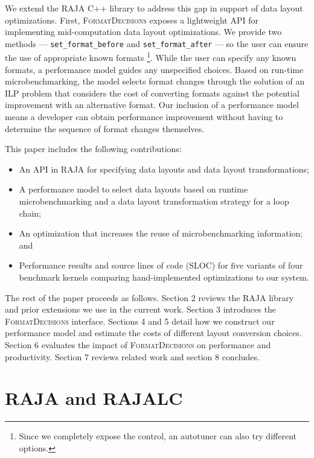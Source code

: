\documentclass[sigconf,review=true]{acmart}
\newcommand{\FormatDecisions}[0]{{\textsc{FormatDecisions}}}
\begin{document}
We extend the RAJA C++ library to address this gap in support of data layout optimizations.
First, \FormatDecisions{} exposes a lightweight API for implementing mid-computation data layout optimizations.
We provide two methods --- \verb.set_format_before. and \verb.set_format_after. --- so the user can ensure the use of appropriate known formats \footnote{Since we completely expose the control, an autotuner can also try different options.}.
While the user can specify any known formats, a performance model guides any unspecified choices.
Based on run-time microbenchmarking, the model selects format changes through the solution of an ILP problem that considers the cost of converting formats against the potential improvement with an alternative format.
Our inclusion of a performance model means a developer can obtain performance improvement without having to determine the sequence of format changes themselves.

This paper includes the following contributions:
\begin{itemize}
\item An API in RAJA for specifying data layouts and data layout transformations;
\item A performance model to select data layouts based on runtime microbenchmarking and a data layout transformation strategy for a loop chain;
\item An optimization that increases the reuse of microbenchmarking information; and
\item Performance results and source lines of code (SLOC) for five variants of four benchmark kernels comparing hand-implemented optimizations to our system.
\end{itemize} 

The rest of the paper proceeds as follows. 
Section 2 reviews the RAJA library and prior extensions we use in the current work.
Section 3 introduces the \FormatDecisions{} interface.
Sections 4 and 5 detail how we construct our performance model and estimate the costs of different layout conversion choices.
Section 6 evaluates the impact of \FormatDecisions{}  on performance and productivity.
Section 7 reviews related work and section 8 concludes.


\section{RAJA and RAJALC}
\end{document}
